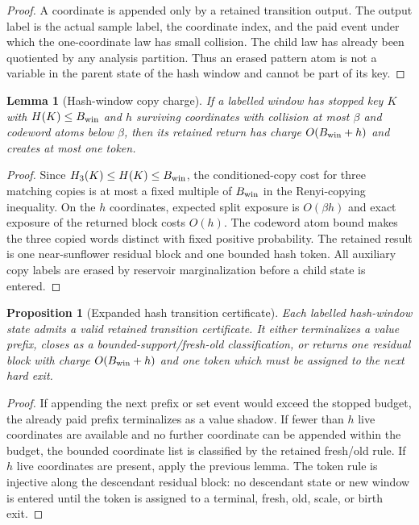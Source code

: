 \documentclass[11pt]{article}
\newtheorem{lemma}[theorem]{Lemma}
\newtheorem{proposition}[theorem]{Proposition}
\theoremstyle{remark}
\begin{document}
\begin{proof}
A coordinate is appended only by a retained transition output.  The output label is the actual sample label, the coordinate index, and the paid event under which the one-coordinate law has small collision.  The child law has already been quotiented by any analysis partition.  Thus an erased pattern atom is not a variable in the parent state of the hash window and cannot be part of its key.
\end{proof}

\begin{lemma}[Hash-window copy charge]\label{lem:app-hash-copy-charge}
If a labelled window has stopped key $K$ with $H(K)\le B_{\rm win}$ and $h$ surviving coordinates with collision at most $\beta$ and codeword atoms below $\beta$, then its retained return has charge $O(B_{\rm win}+h)$ and creates at most one token.
\end{lemma}

\begin{proof}
Since $H_3(K)\le H(K)\le B_{\rm win}$, the conditioned-copy cost for three matching copies is at most a fixed multiple of $B_{\rm win}$ in the Renyi-copying inequality.  On the $h$ coordinates, expected split exposure is $O(\beta h)$ and exact exposure of the returned block costs $O(h)$.  The codeword atom bound makes the three copied words distinct with fixed positive probability.  The retained result is one near-sunflower residual block and one bounded hash token.  All auxiliary copy labels are erased by reservoir marginalization before a child state is entered.
\end{proof}

\begin{proposition}[Expanded hash transition certificate]\label{prop:app-hash-certificate}
Each labelled hash-window state admits a valid retained transition certificate.  It either terminalizes a value prefix, closes as a bounded-support/fresh-old classification, or returns one residual block with charge $O(B_{\rm win}+h)$ and one token which must be assigned to the next hard exit.
\end{proposition}

\begin{proof}
If appending the next prefix or set event would exceed the stopped budget, the already paid prefix terminalizes as a value shadow.  If fewer than $h$ live coordinates are available and no further coordinate can be appended within the budget, the bounded coordinate list is classified by the retained fresh/old rule.  If $h$ live coordinates are present, apply the previous lemma.  The token rule is injective along the descendant residual block: no descendant state or new window is entered until the token is assigned to a terminal, fresh, old, scale, or birth exit.
\end{proof}
\end{document}
